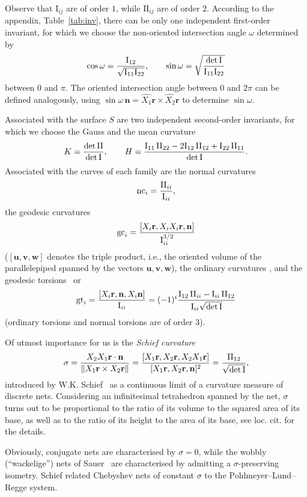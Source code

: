 \documentclass[pdftex]{sigma}
\let\ve\mathbf
\def\I#1#2{\mathrm{I}_{#1#2}}
\def\II#1#2{\mathrm{II}_{#1#2}}
\def\curv#1{{\mathop{\rm c}}_{#1}}
\def\nc#1{{\mathop{\rm nc}}_{#1}}
\def\gc#1{{\mathop{\rm gc}}_{#1}}
\def\gtor#1{{{\rm gt}}_{#1}}
\def\detI{{\rm det\,I}}
\def\detII{{\rm det\,II}}
\numberwithin{equation}{section}
\begin{document}
Observe that $\I ij$ are of order $1$, while $\II ij$ are of order $2$.
According to the appendix, Table~\ref{tab:inv}, there can be only one independent
first-order invariant,
for which we choose the non-oriented intersection angle $\omega$
determined by 
\[
\cos\omega = \frac{\I12}{\sqrt{\I11 \I22}},
\qquad
\sin\omega = \sqrt{\frac{\detI}{\I11 \I22}}
\]
between $0$ and $\pi$.
The oriented intersection angle between $0$ and $2 \pi$ can be defined analogously,
using $\sin\omega\,\ve n = \widehat{X_1} \ve r \times \widehat{X_2} \ve r$ to determine
$\sin\omega$.

Associated with the surface $S$ are two independent second-order invariants,
for which we choose the Gauss and the mean curvature
\[
K = \frac{\detII}{\detI},\qquad
H = \frac{\I 11\,\II 22 - 2 \I 12\,\II 12
 + \I 22\,\II 11}{\detI}.
\]
Associated with the curves of each family
are
the normal curvatures
\[
\nc{i} = \frac{\II ii}{\I ii},
\]
the geodesic curvatures
\[
\gc{i} = \frac{[X_i \ve r, X_i X_i \ve r, \ve n]}
  {\I ii^{3/2}}
\]
($[\ve u, \ve v, \ve w]$ denotes the triple product,
i.e., the oriented volume of the parallelepiped spanned by the vectors
$\ve u, \ve v, \ve w$),
the ordinary curvatures
\smash{$\curv{i} = \sqrt{\vphantom{|^2}\smash{\nc{i}^2 + \gc{i}^2}}$},
and the geodesic torsions~\cite{JKW} or~\cite[p.~165]{RvL}
\[
\gtor i = \frac{[X_i \ve r, \ve n, X_i \ve n]}{\I ii}
 = (-1)^i \frac{\I 12\,\II ii - \I ii\,\II 12}
     {\I ii \sqrt{\detI} }
\]
(ordinary torsions and normal torsions are of order 3).

Of utmost importance for us is the
{\it Schief curvature}
\begin{gather}\label{eq:sigma}
\sigma = \frac{X_2 X_1 \ve r \cdot \ve n}{\|X_1 \ve r \times X_2 \ve r\|}
 = \frac{[X_1 \ve r, X_2 \ve r, X_2 X_1 \ve r]}
  {[X_1 \ve r, X_2 \ve r, \ve n]^2} = \frac{\II 12}{\sqrt{\detI}},
\end{gather}
introduced by W.K. Schief~\cite[Section~3.1]{WKS-2007} as a continuous limit
of a curvature measure of discrete nets.
Considering an infinitesimal tetrahedron spanned by the net,
$\sigma$ turns out to be proportional
to the ratio of its volume
to the squared area
of its base, as well as to the ratio of its height to the area of
its base, see loc. cit. for the details.

\begin{Remark}\label{rem:sigma}
Obviously, conjugate nets are characterised by $\sigma = 0$, while
the wobbly (``wa\-ckelige'') nets of Sauer~\cite{RS-1933} are
characterised by admitting a $\sigma$-preserving isometry.
Schief \cite[Sec\-tion~2.2]{WKS-2007} related Chebyshev nets of constant $\sigma$
to the Pohlmeyer--Lund--Regge system.
\end{Remark}
\end{document}
